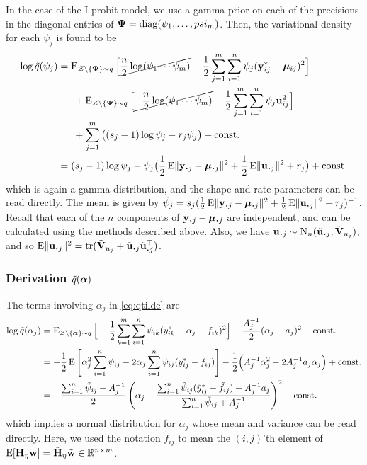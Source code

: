 In the case of the I-probit model, we use a gamma prior on each of the precisions in the diagonal entries of $\bPsi=\diag(\psi_1,\dots,psi_m)$.
Then, the variational density for each $\psi_j$ is found to be
\begin{align*}
  \log \tilde q(\psi_j)
  &= \E_{\cZ\backslash\{\bPsi\}\sim q} \Big[ 
  \cancel{\half[n]\log (\psi_1\cdots\psi_m)} - \half\sum_{j=1}^m \sum_{i=1}^n \psi_j(\by^*_{ij} - \bmu_{ij})^2 
  \Big] \\
  &\phantom{==} +\E_{\cZ\backslash\{\bPsi\}\sim q} \Big[ 
  \cancel{- \half[n]\log (\psi_1\cdots\psi_m)} - \half\sum_{j=1}^m \sum_{i=1}^n \psi_j \bu_{ij}^2 
  \Big] \\
  &\phantom{==} + \sum_{j=1}^m \big( (s_j - 1)\log \psi_j - r_j\psi_j \big) + \const \\
  &= (s_j - 1)\log \psi_j - \psi_j \big( \half \E\norm{\by_{\bigcdot j} -  \bmu_{\bigcdot j}}^2 + \half\E\norm{\bu_{\bigcdot j}}^2  + r_j \big) + \const
\end{align*}
which is again a gamma distribution, and the shape and rate parameters can be read directly.
The mean is given by $\tilde\psi_j = s_j(\half \E\norm{\by_{\bigcdot j} - \bmu_{\bigcdot j}}^2 + \half \E\norm{\bu_{\bigcdot j}}^2  + r_j)^{-1}$.
Recall that each of the $n$ components of $\by_{\bigcdot j} -  \bmu_{\bigcdot j}$ are independent, and can be calculated using the methods described above.
Also, we have $\bu_{\bigcdot j} \sim \N_n(\tilde\bu_{\bigcdot j}, \tilde\bV_{u_j})$, and so $  \E\norm{\bu_{\bigcdot j}}^2 = \tr(\tilde\bV_{u_j} + \tilde\bu_{\bigcdot j}\tilde\bu_{\bigcdot j}^\top)$.

\subsubsection[Derivation of q alpha]{Derivation $\tilde q(\balpha)$}

The terms involving $\alpha_j$ in \cref{eq:qtilde} are
\begin{align*}
  \log \tilde q(\alpha_j)
  &= \E_{\cZ\backslash\{\balpha\}\sim q} \Big[ 
  -\half\sum_{k=1}^m \sum_{i=1}^n \psi_{ik}(y^*_{ik} - \alpha_j - f_{ik})^2 
  \Big] 
  - \frac{A_j^{-1}}{2} (\alpha_j - a_j)^2 + \const \\
  &= -\half\E \left[\alpha_j^2 \sum_{i=1}^n \psi_{ij}  - 2\alpha_j\sum_{i=1}^n \psi_{ij}(y^*_{ij} -  f_{ij}) \right]
  -\half\Big(A_j^{-1}\alpha_j^2 - 2A_j^{-1}a_j\alpha_j  \Big) + \const \\
  &=-\half[\sum_{i=1}^n \tilde\psi_{ij} + A_j^{-1}] \left( 
  \alpha_j - 
  \frac{\sum_{i=1}^n \tilde\psi_{ij}(\tilde y^*_{ij} -  \tilde f_{ij}) + A_j^{-1}a_j}{\sum_{i=1}^n \tilde\psi_{ij} + A_j^{-1}}  \right)^2 + \const
\end{align*}
which implies a normal distribution for $\alpha_j$ whose mean and variance can be read directly.
Here, we used the notation $\tilde f_{ij}$ to mean the $(i,j)$'th element of 
$\E[\bH_\eta\bw] = \tilde\bH_\eta \tilde \bw \in \bbR^{n\times m}$.

